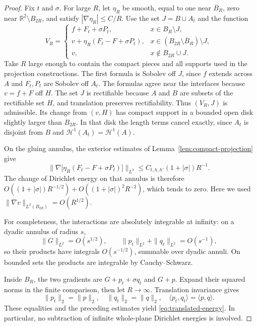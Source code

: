 \begin{proof}
Fix $t$ and $\sigma$. For large $R$, let $\eta_R$ be smooth, equal to
one near $\overline B_R$, zero near $\mathbb R^2\setminus B_{2R}$,
and satisfy $|\nabla\eta_R|\leq C/R$. Use the set
$J=B\cup A_t$ and the function
\[
 V_R=\begin{cases}
 f+F_t+\sigma P_t,&x\in B_R\setminus J,\\
 v+\eta_R(F_t-F+\sigma P_t),&x\in(B_{2R}\setminus\overline B_R)\setminus J,\\
 v,&x\notin B_{2R}\cup J.
 \end{cases}
\]
Take $R$ large enough to contain the compact pieces and all supports used
in the projection constructions. The first formula is Sobolev off $J$,
since $f$ extends across $A$ and $F_t,P_t$ are Sobolev off $A_t$.
The formulas agree near the interfaces because $v=f+F$ off $H$.
The set $J$ is rectifiable because $A$ and $B$ are subsets of the
rectifiable set $H$, and translation preserves rectifiability.
Thus $(V_R,J)$ is admissible. Its change from $(v,H)$ has compact support
in a bounded open disk slightly larger than $B_{2R}$.
In that disk the length terms cancel exactly, since $A_t$ is disjoint
from $B$ and $\mathcal H^1(A_t)=\mathcal H^1(A)$.

On the gluing annulus, the exterior estimates of
Lemma~\ref{lem:compact-projection} give
\[
 \bigl\|\nabla\bigl[\eta_R(F_t-F+\sigma P_t)\bigr]\bigr\|_{L^2}
       \leq C_{t,h,h'}(1+|\sigma|)R^{-1}.
\]
The change of Dirichlet energy on that annulus is therefore
$O((1+|\sigma|)R^{-1/2})+O((1+|\sigma|)^2R^{-2})$, which tends to zero.
Here we used $\|\nabla v\|_{L^2(B_{2R})}=O(R^{1/2})$.

For completeness, the interactions are absolutely integrable at infinity:
on a dyadic annulus of radius $s$,
\[
 \|G\|_{L^2}=O(s^{1/2}),\qquad
 \|p_t\|_{L^2}+\|q_t\|_{L^2}=O(s^{-1}),
\]
so their products have integrals $O(s^{-1/2})$, summable over dyadic
annuli. On bounded sets the products are integrable by Cauchy--Schwarz.

Inside $B_R$, the two gradients are $G+p_t+\sigma q_t$ and $G+p$.
Expand their squared norms in the finite comparison, then let
$R\to\infty$. Translation invariance gives
\[
 \|p_t\|_2=\|p\|_2,\quad \|q_t\|_2=\|q\|_2,\quad
 \langle p_t,q_t\rangle=\langle p,q\rangle.
\]
These equalities and the preceding estimates yield
\eqref{eq:translated-energy}. In particular, no subtraction of infinite
whole-plane Dirichlet energies is involved.
\end{proof}

